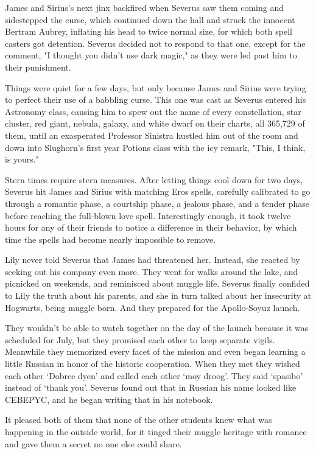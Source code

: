 \documentclass[a4paper,11pt]{article}
\begin{document}
James and Sirius's next jinx backfired when Severus saw them coming and sidestepped the curse, which continued down the hall and struck the innocent Bertram Aubrey, inflating his head to twice normal size, for which both spell casters got detention. Severus decided not to respond to that one, except for the comment, "I thought you didn't use dark magic," as they were led past him to their punishment.

Things were quiet for a few days, but only because James and Sirius were trying to perfect their use of a babbling curse. This one was cast as Severus entered his Astronomy class, causing him to spew out the name of every constellation, star cluster, red giant, nebula, galaxy, and white dwarf on their charts, all 365,729 of them, until an exasperated Professor Sinistra hustled him out of the room and down into Slughorn's first year Potions class with the icy remark, "This, I think, is yours."

Stern times require stern measures. After letting things cool down for two days, Severus hit James and Sirius with matching Eros spells, carefully calibrated to go through a romantic phase, a courtship phase, a jealous phase, and a tender phase before reaching the full-blown love spell. Interestingly enough, it took twelve hours for any of their friends to notice a difference in their behavior, by which time the spells had become nearly impossible to remove.

Lily never told Severus that James had threatened her. Instead, she reacted by seeking out his company even more. They went for walks around the lake, and picnicked on weekends, and reminisced about muggle life. Severus finally confided to Lily the truth about his parents, and she in turn talked about her insecurity at Hogwarts, being muggle born. And they prepared for the Apollo-Soyuz launch.

They wouldn't be able to watch together on the day of the launch because it was scheduled for July, but they promised each other to keep separate vigils. Meanwhile they memorized every facet of the mission and even began learning a little Russian in honor of the historic cooperation. When they met they wished each other `Dobree dyen' and called each other `moy droog'. They said `spasibo' instead of `thank you'. Severus found out that in Russian his name looked like CEBEPYC, and he began writing that in his notebook.

It pleased both of them that none of the other students knew what was happening in the outside world, for it tinged their muggle heritage with romance and gave them a secret no one else could share.
\end{document}

